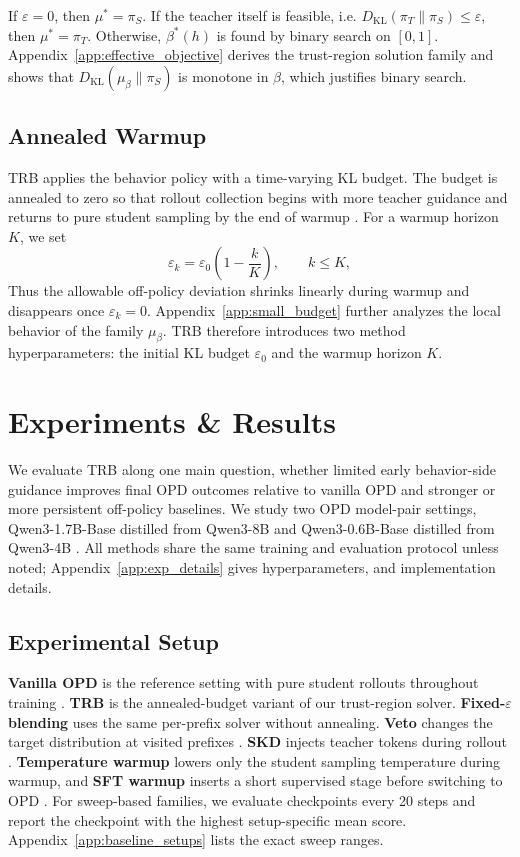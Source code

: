\documentclass{llmxive}
\begin{document}
If $\varepsilon=0$, then $\mu^*=\pi_S$.
If the teacher itself is feasible, i.e. $D_{\mathrm{KL}}(\pi_T\|\pi_S)\le\varepsilon$, then $\mu^*=\pi_T$.
Otherwise, $\beta^*(h)$ is found by binary search on $[0,1]$.
Appendix~\ref{app:effective_objective} derives the trust-region solution family and shows that $D_{\mathrm{KL}}(\mu_\beta\|\pi_S)$ is monotone in $\beta$, which justifies binary search.

\subsection{Annealed Warmup}

TRB applies the behavior policy with a time-varying KL budget.
The budget is annealed to zero so that rollout collection begins with more teacher guidance and returns to pure student sampling by the end of warmup \citep{dagger, bengio2015scheduled}.
For a warmup horizon $K$, we set
\begin{equation}
\varepsilon_k
=
\varepsilon_0 \left(1-\frac{k}{K}\right),
\qquad k \le K,
\end{equation}
Thus the allowable off-policy deviation shrinks linearly during warmup and disappears once $\varepsilon_k=0$.
Appendix~\ref{app:small_budget} further analyzes the local behavior of the family $\mu_\beta$. TRB therefore introduces two method hyperparameters: the initial KL budget $\varepsilon_0$ and the warmup horizon $K$.

\section{Experiments \& Results}

We evaluate TRB along one main question, whether limited early behavior-side guidance improves final OPD outcomes relative to vanilla OPD and stronger or more persistent off-policy baselines.
We study two OPD model-pair settings, Qwen3-1.7B-Base distilled from Qwen3-8B and Qwen3-0.6B-Base distilled from Qwen3-4B \citep{yang2025qwen3}.
All methods share the same training and evaluation protocol unless noted; Appendix~\ref{app:exp_details} gives hyperparameters, and implementation details.

\subsection{Experimental Setup}

\textbf{Vanilla OPD} is the reference setting with pure student rollouts throughout training \citep{opd,li2026rethinking}.
\textbf{TRB} is the annealed-budget variant of our trust-region solver.
\textbf{Fixed-$\varepsilon$ blending} uses the same per-prefix solver without annealing.
\textbf{Veto} changes the target distribution at visited prefixes \citep{veto}.
\textbf{SKD} injects teacher tokens during rollout \citep{skd}.
\textbf{Temperature warmup} lowers only the student sampling temperature during warmup, and \textbf{SFT warmup} inserts a short supervised stage before switching to OPD \citep{hinton2015distilling,opd}.
For sweep-based families, we evaluate checkpoints every 20 steps and report the checkpoint with the highest setup-specific mean score.
Appendix~\ref{app:baseline_setups} lists the exact sweep ranges.
\end{document}
